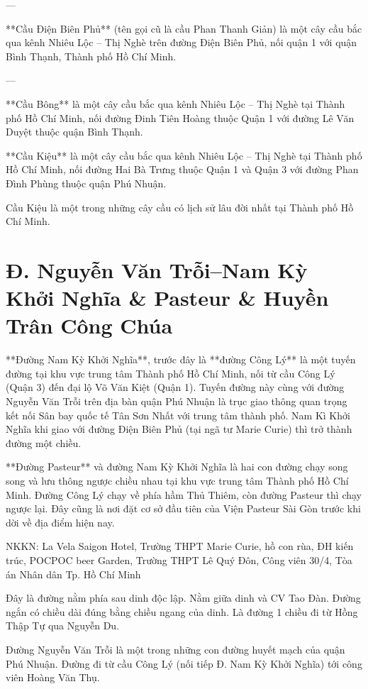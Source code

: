 ---

**Cầu Điện Biên Phủ** (tên gọi cũ là cầu Phan Thanh Giản) là một cây cầu bắc qua kênh Nhiêu Lộc – Thị Nghè trên đường Điện Biên Phủ, nối quận 1 với quận Bình Thạnh, Thành phố Hồ Chí Minh.

---

**Cầu Bông** là một cây cầu bắc qua kênh Nhiêu Lộc – Thị Nghè tại Thành phố Hồ Chí Minh, nối đường Đinh Tiên Hoàng thuộc Quận 1 với đường Lê Văn Duyệt thuộc quận Bình Thạnh.

**Cầu Kiệu** là một cây cầu bắc qua kênh Nhiêu Lộc – Thị Nghè tại Thành phố Hồ Chí Minh, nối đường Hai Bà Trưng thuộc Quận 1 và Quận 3 với đường Phan Đình Phùng thuộc quận Phú Nhuận.

Cầu Kiệu là một trong những cây cầu có lịch sử lâu đời nhất tại Thành phố Hồ Chí Minh.

\section{Đ. Nguyễn Văn Trỗi--Nam Kỳ Khởi Nghĩa \& Pasteur \& Huyền Trân Công Chúa}

**Đường Nam Kỳ Khởi Nghĩa**, trước đây là **đường Công Lý** là một tuyến đường tại khu vực trung tâm Thành phố Hồ Chí Minh, nối từ cầu Công Lý (Quận 3) đến đại lộ Võ Văn Kiệt (Quận 1). Tuyến đường này cùng với đường Nguyễn Văn Trỗi trên địa bàn quận Phú Nhuận là trục giao thông quan trọng kết nối Sân bay quốc tế Tân Sơn Nhất với trung tâm thành phố. Nam Kì Khởi Nghĩa khi giao với đường Điện Biên Phủ (tại ngã tư Marie Curie) thì trở thành đường một chiều.

**Đường Pasteur** và đường Nam Kỳ Khởi Nghĩa là hai con đường chạy song song và lưu thông ngược chiều nhau tại khu vực trung tâm Thành phố Hồ Chí Minh. Đường Công Lý chạy về phía hầm Thủ Thiêm, còn đường Pasteur thì chạy ngược lại. Đây cũng là nơi đặt cơ sở đầu tiên của Viện Pasteur Sài Gòn trước khi dời về địa điểm hiện nay.

NKKN: La Vela Saigon Hotel, Trường THPT Marie Curie, hồ con rùa, ĐH kiến trúc, POCPOC beer Garden, Trường THPT Lê Quý Đôn, Công viên 30/4, Tòa án Nhân dân Tp. Hồ Chí Minh

Đây là đường nằm phía sau dinh độc lập. Nằm giữa dinh và CV Tao Đàn. Đường ngắn có chiều dài đúng bằng chiều ngang của dinh. Là đường 1 chiều đi từ Hồng Thập Tự qua Nguyễn Du.

Đường Nguyễn Văn Trỗi là một trong những con đường huyết mạch của quận Phú Nhuận. Đường đi từ cầu Công Lý (nối tiếp Đ. Nam Kỳ Khởi Nghĩa) tới công viên Hoàng Văn Thụ.

